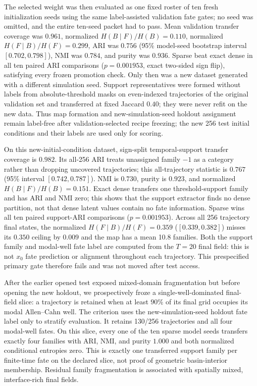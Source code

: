 The selected weight was then evaluated as one fixed roster of ten fresh
initialization seeds using the same label-assisted validation fate gates; no
seed was omitted, and the entire ten-seed packet had to pass. Mean
validation transfer coverage was $0.961$, normalized
$H(B\mid F)/H(B)=0.110$, normalized $H(F\mid B)/H(F)=0.299$, ARI was
$0.756$ (95\% model-seed bootstrap interval $[0.702,0.798]$), NMI was
$0.784$, and purity was $0.936$. Sparse beat exact dense in all ten paired
ARI comparisons ($p=0.001953$, exact two-sided sign flip), satisfying every
frozen promotion check. Only then was a new dataset generated with a different
simulation seed. Support representatives were formed without labels from
absolute-threshold masks on even-indexed trajectories of the original
validation set and transferred at fixed Jaccard $0.40$; they were never refit
on the new data. Thus map formation and new-simulation-seed holdout assignment remain
label-free after validation-selected recipe freezing; the new 256 test initial
conditions and their labels are used only for scoring.

On this new-initial-condition dataset, sign-split temporal-support transfer coverage is $0.982$.
Its all-256 ARI treats unassigned family $-1$ as a category rather than dropping
uncovered trajectories; this all-trajectory statistic is $0.767$ (95\% interval
$[0.742,0.787]$). NMI is $0.730$, purity
is $0.923$, and normalized $H(B\mid F)/H(B)=0.151$. Exact dense transfers one
threshold-support family and has ARI and NMI zero; this shows that the support
extractor finds no dense partition, not that dense latent values contain no
fate information. Sparse wins all ten paired support-ARI comparisons
($p=0.001953$). Across all 256 trajectory final states, the normalized
$H(F\mid B)/H(F)=0.359$ ($[0.339,0.382]$) misses its $0.350$ ceiling by
$0.009$ and the map has a mean 10.8 families. Both the support family and
modal-well fate label are computed from the $T=20$ final field: this is not
$x_0$ fate prediction or alignment throughout each trajectory. This
prespecified primary gate therefore fails and was not moved after test access.

After the earlier opened test exposed mixed-domain fragmentation but before
opening the new holdout, we prospectively froze a single-well-dominated
final-field slice: a trajectory is retained when at least
$90\%$ of its final grid occupies its modal Allen--Cahn well. The criterion
uses the new-simulation-seed holdout fate label only to stratify evaluation. It retains
130/256 trajectories and all four modal-well fates. On this slice, every one
of the ten sparse model seeds transfers exactly four families with ARI, NMI,
and purity $1.000$ and both normalized conditional entropies zero. This is
exactly one transferred support family per finite-time fate on the declared
slice, not proof of geometric basin-interior membership. Residual family
fragmentation is associated with spatially mixed, interface-rich final fields.

